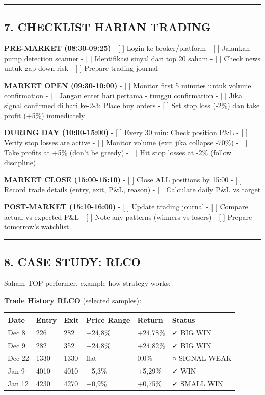 \documentclass[
  10pt,
  a4paper,
]{article}
\begin{document}
\begin{center}\rule{0.5\linewidth}{0.5pt}\end{center}

\subsection{7. CHECKLIST HARIAN TRADING}\label{checklist-harian-trading}

\textbf{PRE-MARKET (08:30-09:25)} - {[} {]} Login ke broker/platform -
{[} {]} Jalankan pump detection scanner - {[} {]} Identifikasi sinyal
dari top 20 saham - {[} {]} Check news untuk gap down risk - {[} {]}
Prepare trading journal

\textbf{MARKET OPEN (09:30-10:00)} - {[} {]} Monitor first 5 minutes
untuk volume confirmation - {[} {]} Jangan enter hari pertama - tunggu
confirmation - {[} {]} Jika signal confirmed di hari ke-2-3: Place buy
orders - {[} {]} Set stop loss (-2\%) dan take profit (+5\%) immediately

\textbf{DURING DAY (10:00-15:00)} - {[} {]} Every 30 min: Check position
P\&L - {[} {]} Verify stop losses are active - {[} {]} Monitor volume
(exit jika collapse -70\%) - {[} {]} Take profits at +5\% (don't be
greedy) - {[} {]} Hit stop losses at -2\% (follow discipline)

\textbf{MARKET CLOSE (15:00-15:10)} - {[} {]} Close ALL positions by
15:00 - {[} {]} Record trade details (entry, exit, P\&L, reason) - {[}
{]} Calculate daily P\&L vs target

\textbf{POST-MARKET (15:10-16:00)} - {[} {]} Update trading journal -
{[} {]} Compare actual vs expected P\&L - {[} {]} Note any patterns
(winners vs losers) - {[} {]} Prepare tomorrow's watchlist

\begin{center}\rule{0.5\linewidth}{0.5pt}\end{center}

\subsection{8. CASE STUDY: RLCO}\label{case-study-rlco}

Saham TOP performer, example how strategy works:

\textbf{Trade History RLCO} (selected samples):

\begin{longtable}[]{@{}llllll@{}}
\toprule\noalign{}
Date & Entry & Exit & Price Range & Return & Status \\
\midrule\noalign{}
\endhead
\bottomrule\noalign{}
\endlastfoot
Dec 8 & 226 & 282 & +24,8\% & +24,78\% & ✓ BIG WIN \\
Dec 9 & 282 & 352 & +24,8\% & +24,82\% & ✓ BIG WIN \\
Dec 22 & 1330 & 1330 & flat & 0,0\% & ○ SIGNAL WEAK \\
Jan 9 & 4010 & 4010 & +5,3\% & +5,29\% & ✓ WIN \\
Jan 12 & 4230 & 4270 & +0,9\% & +0,75\% & ✓ SMALL WIN \\
\end{longtable}
\end{document}

